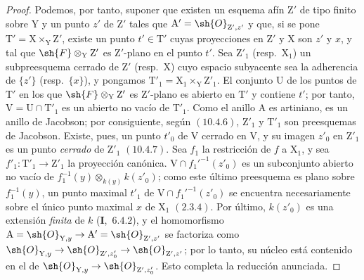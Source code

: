\begin{proof}
Podemos, por tanto, suponer que existen un esquema afín $\mathrm{Z}'$ de tipo finito sobre $\mathrm{Y}$ y un
punto $z'$ de $\mathrm{Z}'$ tales que $\mathrm{A}'=\sh{O}_{\mathrm{Z}',z'}$ y que, si se pone $\mathrm{T}'=\mathrm{X}\times_\mathrm{Y}\mathrm{Z}'$, existe un punto
$t'\in\mathrm{T}'$ cuyas proyecciones en $\mathrm{Z}'$ y $\mathrm{X}$ son $z'$ y $x$, y tal que $\sh{F}\otimes_\mathrm{Y}\mathrm{Z}'$ es $\mathrm{Z}'$-plano en el
punto $t'$. Sea $\mathrm{Z}'_1$ (resp.\ $\mathrm{X}_1$) un subpreesquema cerrado de $\mathrm{Z}'$ (resp.\ $\mathrm{X}$) cuyo espacio subyacente sea
la adherencia de $\{z'\}$ (resp.\ $\{x\}$), y pongamos $\mathrm{T}'_1=\mathrm{X}_1\times_\mathrm{Y}\mathrm{Z}'_1$. El conjunto $\mathrm{U}$ de los
puntos de $\mathrm{T}'$ en los que $\sh{F}\otimes_\mathrm{Y}\mathrm{Z}'$ es $\mathrm{Z}'$-plano es abierto en $\mathrm{T}'$  y contiene $t'$; por tanto,
$\mathrm{V}=\mathrm{U}\cap\mathrm{T}'_1$ es un abierto no vacío de $\mathrm{T}'_1$. Como el anillo $\mathrm{A}$ es artiniano, es un anillo de Jacobson;
por consiguiente, según $(10.4.6)$, $\mathrm{Z}'_1$ y $\mathrm{T}'_1$ son preesquemas de Jacobson. Existe, pues,
un punto $t'_0$ de $\mathrm{V}$ cerrado en $\mathrm{V}$, y su imagen $z'_0$ en $\mathrm{Z}'_1$ es un punto \emph{cerrado} de $\mathrm{Z}'_1$ $(10.4.7)$.
Sea $f_1$ la restricción de $f$ a $\mathrm{X}_1$, y sea $f'_1:\mathrm{T}'_1\to\mathrm{Z}'_1$ la proyección canónica.
$\mathrm{V}\cap f_1'^{-1}(z'_0)$ es un subconjunto abierto no vacío de
$f_1^{-1}(y)\otimes_{k(y)}k(z'_0)$; como este último preesquema es plano sobre $f_1^{-1}(y)$, un punto maximal $t'_1$ de
$\mathrm{V}\cap f_1'^{-1}(z'_0)$ se encuentra necesariamente sobre el único punto maximal $x$ de $\mathrm{X}_1$ $(2.3.4)$.
Por último, $k(z'_0)$ es una extensión \emph{finita} de $k$ (\textbf{I},~$6.4.2$), y el homomorfismo
$\mathrm{A}=\sh{O}_{\mathrm{Y},y}\to\mathrm{A}'=\sh{O}_{\mathrm{Z}',z'}$ se factoriza como
$\sh{O}_{\mathrm{Y},y}\to\sh{O}_{\mathrm{Z}',z'_0}\to\sh{O}_{\mathrm{Z}',z'}$; por lo tanto, su núcleo está contenido en el de
$\sh{O}_{\mathrm{Y},y}\to\sh{O}_{\mathrm{Z}',z'_0}$. Esto completa la reducción anunciada.


\end{proof}

